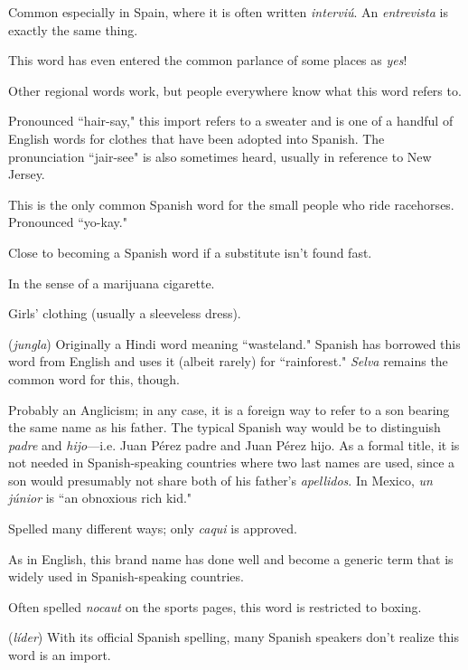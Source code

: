  Common especially in Spain, where it is often
written \emph{interviú}. An \emph{entrevista} is exactly the same thing.

 This word has even entered the common parlance of
some places as \emph{yes}!

 Other regional words work, but people everywhere
know what this word refers to.

 Pronounced ``hair-say," this import refers to a
sweater and is one of a handful of English words for clothes that
have been adopted into Spanish. The pronunciation ``jair-see" is also
sometimes heard, usually in reference to New Jersey.

 This is the only common Spanish word for the
small people who ride racehorses. Pronounced ``yo-kay."

 Close to becoming a Spanish word if a substitute
isn't found fast.

 In the sense of a marijuana cigarette.

 Girls' clothing (usually a sleeveless dress).

 (\emph{jungla}) Originally a Hindi word meaning ``wasteland." Spanish has borrowed this word from English and uses it (albeit
rarely) for ``rainforest." \emph{Selva} remains the common word for this, though.

 Probably an Anglicism; in any case, it is a foreign
way to refer to a son bearing the same name as his father. The typical
Spanish way would be to distinguish \emph{padre} and \emph{hijo}---i.e. Juan Pérez
padre and Juan Pérez hijo. As a formal title, it is not needed in Spanish-speaking countries where two last names are used, since a son would
presumably not share both of his father's \emph{apellidos}. In Mexico, \emph{un júnior} is ``an obnoxious rich kid."

 Spelled many different ways; only \emph{caqui} is approved.

 As in English, this brand name has done well
and become a generic term that is widely used in Spanish-speaking
countries.

 Often spelled \emph{nocaut} on the sports pages, this
word is restricted to boxing.

 (\emph{líder}) With its official Spanish spelling, many Spanish speakers don't realize this word is an import.

